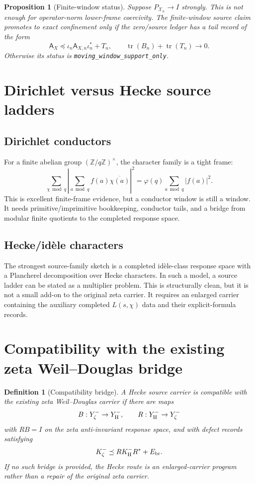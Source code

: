 \documentclass[11pt]{article}
\newtheorem{proposition}{Proposition}
\newtheorem{definition}{Definition}
\newcommand{\A}{\mathsf A}
\newcommand{\X}{\mathcal X}
\newcommand{\tr}{\operatorname{tr}}
\begin{document}
\begin{proposition}[Finite-window status]
Suppose \(P_{\X_n}\to I\) strongly.  This is not enough for operator-norm lower-frame coercivity.  The finite-window source claim promotes to exact confinement only if the zero/source ledger has a tail record of the form
\[
\A_X\preceq \iota_n\A_{X,n}\iota_n^*+T_n,
\qquad
\tr(B_n)+\tr(T_n)\to0.
\]
Otherwise its status is \texttt{moving\_window\_support\_only}.
\end{proposition}

\section{Dirichlet versus Hecke source ladders}
\subsection{Dirichlet conductors}
For a finite abelian group \((\mathbb Z/q\mathbb Z)^\times\), the character family is a tight frame:
\[
\sum_{\chi\bmod q}\left|\sum_{a\bmod q} f(a)\overline{\chi(a)}\right|^2
=\varphi(q)\sum_{a\bmod q}|f(a)|^2.
\]
This is excellent finite-frame evidence, but a conductor window is still a window.  It needs primitive/imprimitive bookkeeping, conductor tails, and a bridge from modular finite quotients to the completed response space.

\subsection{Hecke/id\`ele characters}
The strongest source-family sketch is a completed id\`ele-class response space with a Plancherel decomposition over Hecke characters.  In such a model, a source ladder can be stated as a multiplier problem.  This is structurally clean, but it is not a small add-on to the original zeta carrier.  It requires an enlarged carrier containing the auxiliary completed \(L(s,\chi)\) data and their explicit-formula records.

\section{Compatibility with the existing zeta Weil--Douglas bridge}
\begin{definition}[Compatibility bridge]
A Hecke source carrier is compatible with the existing zeta Weil--Douglas carrier if there are maps
\[
B:Y_\zeta^-\to Y_{\rm H}^- ,
\qquad
R:Y_{\rm H}^-\to Y_\zeta^-
\]
with \(RB=I\) on the zeta anti-invariant response space, and with defect records satisfying
\[
K_\zeta^-\preceq R K_{\rm H}^- R^*+E_{\rm br}.
\]
If no such bridge is provided, the Hecke route is an enlarged-carrier program rather than a repair of the original zeta carrier.
\end{definition}
\end{document}
